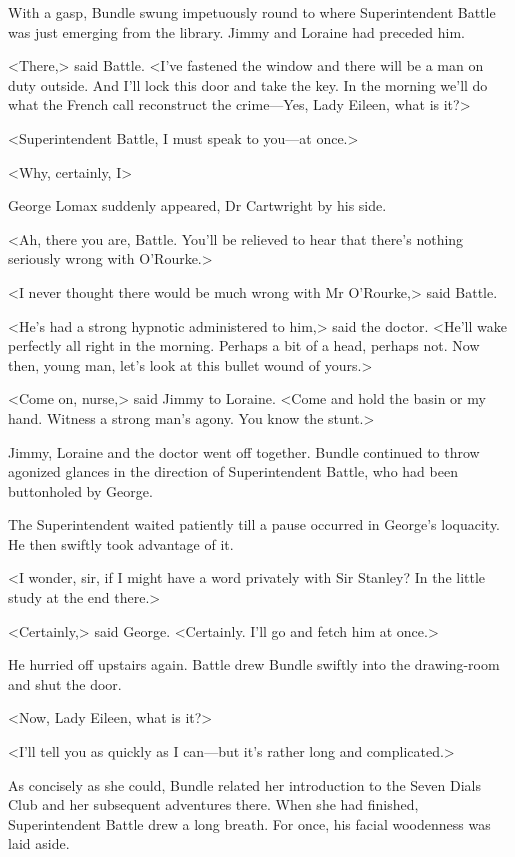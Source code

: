 With a gasp, Bundle swung impetuously round to where Superintendent Battle was just emerging from the library. Jimmy and Loraine had preceded him.

<There,> said Battle. <I've fastened the window and there will be a man on duty outside. And I'll lock this door and take the key. In the morning we'll do what the French call reconstruct the crime—Yes, Lady Eileen, what is it?>

<Superintendent Battle, I must speak to you—at once.>

<Why, certainly, I\longdash>

George Lomax suddenly appeared, Dr Cartwright by his side.

<Ah, there you are, Battle. You'll be relieved to hear that there's nothing seriously wrong with O'Rourke.>

<I never thought there would be much wrong with Mr O'Rourke,> said Battle.

<He's had a strong hypnotic administered to him,> said the doctor. <He'll wake perfectly all right in the morning. Perhaps a bit of a head, perhaps not. Now then, young man, let's look at this bullet wound of yours.>

<Come on, nurse,> said Jimmy to Loraine. <Come and hold the basin or my hand. Witness a strong man's agony. You know the stunt.>

Jimmy, Loraine and the doctor went off together. Bundle continued to throw agonized glances in the direction of Superintendent Battle, who had been buttonholed by George.

The Superintendent waited patiently till a pause occurred in George's loquacity. He then swiftly took advantage of it.

<I wonder, sir, if I might have a word privately with Sir Stanley? In the little study at the end there.>

<Certainly,> said George. <Certainly. I'll go and fetch him at once.>

He hurried off upstairs again. Battle drew Bundle swiftly into the drawing-room and shut the door.

<Now, Lady Eileen, what is it?>

<I'll tell you as quickly as I can—but it's rather long and complicated.>

As concisely as she could, Bundle related her introduction to the Seven Dials Club and her subsequent adventures there. When she had finished, Superintendent Battle drew a long breath. For once, his facial woodenness was laid aside.

